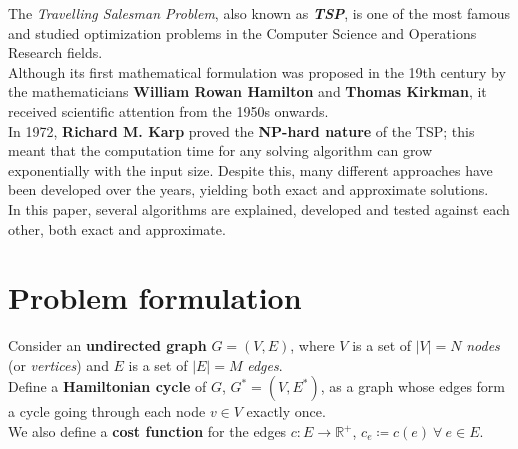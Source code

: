 The \textit{Travelling Salesman Problem}, also known as \textit{\textbf{TSP}}, is one of the most famous and studied optimization problems in the Computer Science and Operations Research fields.\\
Although its first mathematical formulation was proposed in the 19th century by the mathematicians \textbf{William Rowan Hamilton} and \textbf{Thomas Kirkman}, it received scientific attention from the 1950s onwards.\\
In 1972, \textbf{Richard M. Karp} proved the \textbf{NP-hard nature} of the TSP; this meant that the computation time for any solving algorithm can grow exponentially with the input size. Despite this, many different approaches have been developed over the years, yielding both exact and approximate solutions.\\

In this paper, several algorithms are explained, developed and tested against each other, both exact and approximate.

\section{Problem formulation}

Consider an \textbf{undirected graph} $G=(V, E)$, where $V$ is a set of $|V|=N$ \textit{nodes} (or \textit{vertices}) and $E$ is a set of $|E|=M$ \textit{edges}.\\
Define a \textbf{Hamiltonian cycle} of $G$, $G^*=(V, E^*)$, as a graph whose edges form a cycle going through each node $v\in V$ exactly once.\\
We also define a \textbf{cost function} for the edges $c : E \rightarrow \mathbb{R}^+$, $c_e\coloneq c(e) \ \forall \ e\in E$.\\

